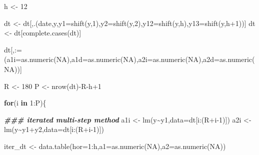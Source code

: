 \documentclass[
  12pt,
  oneside]{book}
\newenvironment{Shaded}{\begin{snugshade}}{\end{snugshade}}
\newcommand{\AttributeTok}[1]{\textcolor[rgb]{0.77,0.63,0.00}{#1}}
\newcommand{\ConstantTok}[1]{\textcolor[rgb]{0.00,0.00,0.00}{#1}}
\newcommand{\ControlFlowTok}[1]{\textcolor[rgb]{0.13,0.29,0.53}{\textbf{#1}}}
\newcommand{\DecValTok}[1]{\textcolor[rgb]{0.00,0.00,0.81}{#1}}
\newcommand{\DocumentationTok}[1]{\textcolor[rgb]{0.56,0.35,0.01}{\textbf{\textit{#1}}}}
\newcommand{\FunctionTok}[1]{\textcolor[rgb]{0.00,0.00,0.00}{#1}}
\newcommand{\NormalTok}[1]{#1}
\newcommand{\OtherTok}[1]{\textcolor[rgb]{0.56,0.35,0.01}{#1}}
\newcommand{\SpecialCharTok}[1]{\textcolor[rgb]{0.00,0.00,0.00}{#1}}
\newcommand{\StringTok}[1]{\textcolor[rgb]{0.31,0.60,0.02}{#1}}
\begin{document}
\begin{Shaded}
\begin{Highlighting}[]
\NormalTok{h }\OtherTok{\textless{}{-}} \DecValTok{12}

\NormalTok{dt }\OtherTok{\textless{}{-}}\NormalTok{ dt[,.(date,y,}\AttributeTok{y1=}\FunctionTok{shift}\NormalTok{(y,}\DecValTok{1}\NormalTok{),}\AttributeTok{y2=}\FunctionTok{shift}\NormalTok{(y,}\DecValTok{2}\NormalTok{),}\AttributeTok{y12=}\FunctionTok{shift}\NormalTok{(y,h),}\AttributeTok{y13=}\FunctionTok{shift}\NormalTok{(y,h}\SpecialCharTok{+}\DecValTok{1}\NormalTok{))]}
\NormalTok{dt }\OtherTok{\textless{}{-}}\NormalTok{ dt[}\FunctionTok{complete.cases}\NormalTok{(dt)]}

\NormalTok{dt[,}\StringTok{\textasciigrave{}}\AttributeTok{:=}\StringTok{\textasciigrave{}}\NormalTok{(}\AttributeTok{a1i=}\FunctionTok{as.numeric}\NormalTok{(}\ConstantTok{NA}\NormalTok{),}\AttributeTok{a1d=}\FunctionTok{as.numeric}\NormalTok{(}\ConstantTok{NA}\NormalTok{),}\AttributeTok{a2i=}\FunctionTok{as.numeric}\NormalTok{(}\ConstantTok{NA}\NormalTok{),}\AttributeTok{a2d=}\FunctionTok{as.numeric}\NormalTok{(}\ConstantTok{NA}\NormalTok{))]}

\NormalTok{R }\OtherTok{\textless{}{-}} \DecValTok{180}
\NormalTok{P }\OtherTok{\textless{}{-}} \FunctionTok{nrow}\NormalTok{(dt)}\SpecialCharTok{{-}}\NormalTok{R}\SpecialCharTok{{-}}\NormalTok{h}\SpecialCharTok{+}\DecValTok{1}

\ControlFlowTok{for}\NormalTok{(i }\ControlFlowTok{in} \DecValTok{1}\SpecialCharTok{:}\NormalTok{P)\{}
  
  \DocumentationTok{\#\#\# iterated multi{-}step method}
\NormalTok{  a1i }\OtherTok{\textless{}{-}} \FunctionTok{lm}\NormalTok{(y}\SpecialCharTok{\textasciitilde{}}\NormalTok{y1,}\AttributeTok{data=}\NormalTok{dt[i}\SpecialCharTok{:}\NormalTok{(R}\SpecialCharTok{+}\NormalTok{i}\DecValTok{{-}1}\NormalTok{)])}
\NormalTok{  a2i }\OtherTok{\textless{}{-}} \FunctionTok{lm}\NormalTok{(y}\SpecialCharTok{\textasciitilde{}}\NormalTok{y1}\SpecialCharTok{+}\NormalTok{y2,}\AttributeTok{data=}\NormalTok{dt[i}\SpecialCharTok{:}\NormalTok{(R}\SpecialCharTok{+}\NormalTok{i}\DecValTok{{-}1}\NormalTok{)])}
  
\NormalTok{  iter\_dt }\OtherTok{\textless{}{-}} \FunctionTok{data.table}\NormalTok{(}\AttributeTok{hor=}\DecValTok{1}\SpecialCharTok{:}\NormalTok{h,}\AttributeTok{a1=}\FunctionTok{as.numeric}\NormalTok{(}\ConstantTok{NA}\NormalTok{),}\AttributeTok{a2=}\FunctionTok{as.numeric}\NormalTok{(}\ConstantTok{NA}\NormalTok{))}
  

\end{Highlighting}
\end{Shaded}
\end{document}
